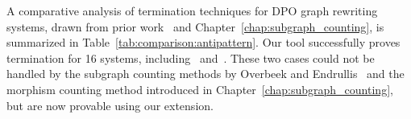 A comparative analysis of termination techniques for DPO graph rewriting systems, drawn from prior work~\cite{plump1995ontermination,plump2018modular,bruggink2014termination,bruggink2015proving,endrullis2024generalized_arxiv_v2,
overbeek2024termination_lmcs} and Chapter~\ref{chap:subgraph_counting}, is summarized in Table~\ref{tab:comparison:antipattern}. 
Our tool successfully proves termination for 16 systems, including~\cite[Example D.3]{endrullis2024generalized_arxiv_v2} and~\cite[Example 1]{bruggink2014termination}. These two cases could not be handled by the subgraph counting methods by Overbeek and Endrullis~\cite{overbeek2024termination_lmcs} and the morphism counting method introduced in Chapter~\ref{chap:subgraph_counting}, but are now provable using our extension.
